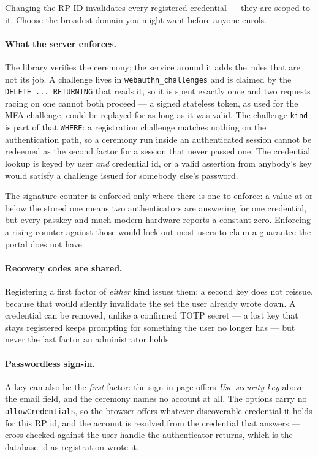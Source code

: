 \documentclass[12pt,a4paper,twoside]{report}
\newcommand{\code}[1]{\texttt{#1}}
\begin{document}
Changing the RP ID invalidates every registered credential --- they are scoped to
it. Choose the broadest domain you might want before anyone enrols.

\paragraph{What the server enforces.}
The library verifies the ceremony; the service around it adds the rules that are
not its job. A challenge lives in \code{webauthn\_challenges} and is claimed by
the \code{DELETE ... RETURNING} that reads it, so it is spent exactly once and two
requests racing on one cannot both proceed --- a signed stateless token, as used
for the MFA challenge, could be replayed for as long as it was valid. The
challenge \code{kind} is part of that \code{WHERE}: a registration challenge
matches nothing on the authentication path, so a ceremony run inside an
authenticated session cannot be redeemed as the second factor for a session that
never passed one. The credential lookup is keyed by user \emph{and} credential id,
or a valid assertion from anybody's key would satisfy a challenge issued for
somebody else's password.

The signature counter is enforced only where there is one to enforce: a value at
or below the stored one means two authenticators are answering for one credential,
but every passkey and much modern hardware reports a constant zero. Enforcing a
rising counter against those would lock out most users to claim a guarantee the
portal does not have.

\paragraph{Recovery codes are shared.} Registering a first factor of
\emph{either} kind issues them; a second key does not reissue, because that would
silently invalidate the set the user already wrote down. A credential can be
removed, unlike a confirmed TOTP secret --- a lost key that stays registered keeps
prompting for something the user no longer has --- but never the last factor an
administrator holds.

\paragraph{Passwordless sign-in.} A key can also be the \emph{first} factor: the
sign-in page offers \emph{Use security key} above the email field, and the
ceremony names no account at all. The options carry no \code{allowCredentials},
so the browser offers whatever discoverable credential it holds for this RP id,
and the account is resolved from the credential that answers --- cross-checked
against the user handle the authenticator returns, which is the database id as
registration wrote it.
\end{document}
